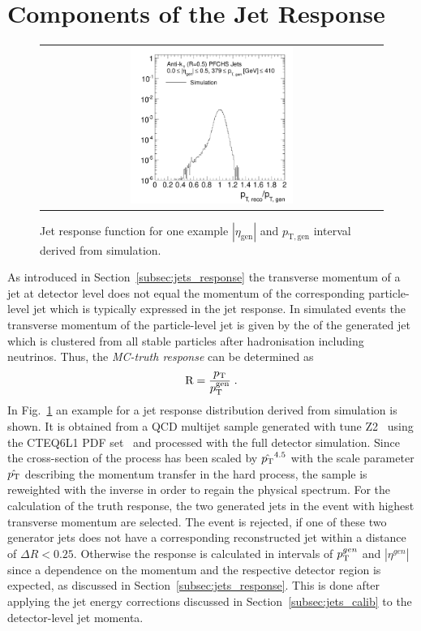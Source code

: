\section{Components of the Jet Response}
\label{sec:jer_response}
\begin{figure}[!tp]
  \centering
  \begin{tabular}{c}
                \includegraphics[width=0.49\textwidth]{figures/TruthResponse_example_final_nominal_v4.pdf}
  \end{tabular}
  \caption{Jet response function for one example $|\eta_\mathrm{gen}|$ and $p_\mathrm{T, gen}$ interval derived from simulation.}
  \label{fig:response}
\end{figure}
As introduced in Section~\ref{subsec:jets_response} the transverse momentum of a jet at detector level does not equal the momentum of the corresponding particle-level jet which is typically expressed in the jet response. In simulated events the transverse momentum of the particle-level jet is given by the \pt of the generated jet which is clustered from all stable particles after hadronisation including neutrinos. Thus, the \textit{MC-truth response} can be determined as
\begin{equation}
\mathrm{R} = \frac{p_{\text{T}}}{p_{\text{T}}^{\mathrm{gen}}} \; .
\end{equation}
 In Fig.~\ref{fig:response} an example for a jet response distribution derived from simulation is shown. It is obtained from a QCD multijet sample generated with  tune Z2~\cite{Chatrchyan:2011id} using the CTEQ6L1 PDF set~\cite{Pumplin:2002vw} and processed with the full detector simulation. Since the cross-section of the process has been scaled by $\hat{p_{\text{T}}}^{4.5}$ with the scale parameter $\hat{p_{\text{T}}}$ describing the momentum transfer in the hard process, the sample is reweighted with the inverse in order to regain the physical spectrum. For the calculation of the truth response, the two generated jets in the event with highest transverse momentum are selected. The event is rejected, if one of these two generator jets does not have a corresponding reconstructed jet within a distance of $\Delta R < 0.25$. Otherwise the response is calculated in intervals of $p_{\text{T}}^{gen}$ and $|\eta^{gen}|$  since a dependence on the momentum and the respective detector region is expected, as discussed in Section~\ref{subsec:jets_response}. This is done after applying the jet energy corrections discussed in Section~\ref{subsec:jets_calib} to the detector-level jet momenta. \\

